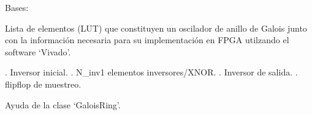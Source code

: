 \documentclass[letterpaper,10pt,english]{sphinxmanual}
\begin{document}

\begin{fulllineitems}
\label{\detokenize{myfpga:myfpga.ring_osc.GaloisRing}}
\pysigstartsignatures
{}
\pysigstopsignatures
\sphinxAtStartPar
Bases: 

\sphinxAtStartPar
Lista de elementos (LUT) que constituyen un oscilador de anillo
de Galois junto con la información necesaria para su implementación
en FPGA utilzando el software ‘Vivado’.
\begin{description}
\sphinxAtStartPar
. Inversor inicial.
. N\_inv\sphinxhyphen{}1 elementos inversores/XNOR.
. Inversor de salida.
. flip\sphinxhyphen{}flop de muestreo.

\end{description}

\begin{fulllineitems}
\label{\detokenize{myfpga:myfpga.ring_osc.GaloisRing.help}}
\pysigstartsignatures
{}
\pysigstopsignatures
\sphinxAtStartPar
Ayuda de la clase ‘GaloisRing’.

\end{fulllineitems}


\end{fulllineitems}

\end{document}
